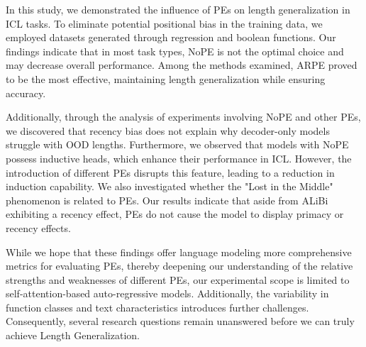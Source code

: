 \documentclass[letterpaper]{article} %
\begin{document}
In this study, we demonstrated the influence of PEs on length generalization in ICL tasks. To eliminate potential positional bias in the training data, we employed datasets generated through regression and boolean functions. Our findings indicate that in most task types, NoPE is not the optimal choice and may decrease overall performance. Among the methods examined, ARPE proved to be the most effective, maintaining length generalization while ensuring accuracy.

Additionally, through the analysis of experiments involving NoPE and other PEs, we discovered that recency bias does not explain why decoder-only models struggle with OOD lengths. Furthermore, we observed that models with NoPE possess inductive heads, which enhance their performance in ICL. However, the introduction of different PEs disrupts this feature, leading to a reduction in induction capability. We also investigated whether the "Lost in the Middle" phenomenon is related to PEs. Our results indicate that aside from ALiBi exhibiting a recency effect, PEs do not cause the model to display primacy or recency effects.

While we hope that these findings offer language modeling more comprehensive metrics for evaluating PEs, thereby deepening our understanding of the relative strengths and weaknesses of different PEs, our experimental scope is limited to self-attention-based auto-regressive models. Additionally, the variability in function classes and text characteristics introduces further challenges. Consequently, several research questions remain unanswered before we can truly achieve Length Generalization.
%



\newpage
\end{document}
